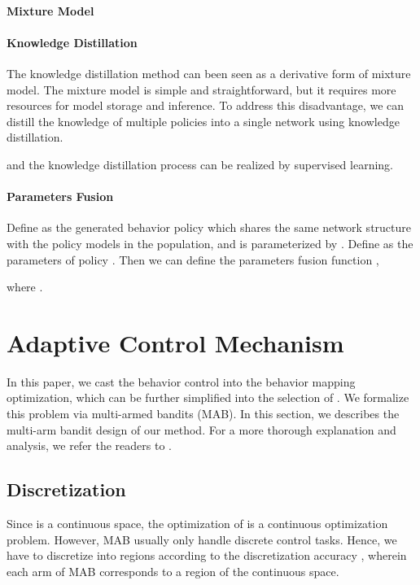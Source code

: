 \paragraph{Mixture Model}


\paragraph{Knowledge Distillation}
The knowledge distillation method can been seen as a  derivative form of mixture model. The mixture model is simple and straightforward, but it requires more resources for model storage and inference. To address this disadvantage, we can distill the knowledge of multiple policies into a single network using knowledge distillation.

and the knowledge distillation process  can be realized by supervised learning.

\paragraph{Parameters Fusion} 
Define  as the generated behavior policy which shares the same network structure with the policy models in the population, and is parameterized by . Define  as the parameters of policy . Then we can define the parameters fusion function ,

where .

\clearpage
\section{Adaptive Control Mechanism}
\label{Sec: appendix MAB}

In this paper, we cast the behavior control into the behavior mapping optimization, which can be further simplified into the selection of . We formalize this problem via multi-armed bandits (MAB).  In this section, we describes  the multi-arm bandit design of our method. For a more thorough explanation and analysis, we refer the readers to \citep{garivier2008upper}.




 
\subsection{Discretization}
Since  is a continuous space, the optimization of  is a  continuous optimization problem.  However, MAB usually only handle discrete control tasks. Hence, we have to discretize  into  regions according to the discretization accuracy , wherein each arm of MAB corresponds to a region of the continuous space. 

